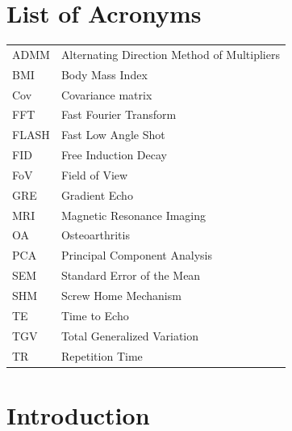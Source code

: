 \documentclass{micro-econ-thesis}
\begin{document}
\section*{List of Acronyms}
\begin{tabular}{@{}ll}
ADMM & Alternating Direction Method of Multipliers \\
BMI & Body Mass Index \\
Cov & Covariance matrix \\
FFT & Fast Fourier Transform \\ 
FLASH & Fast Low Angle Shot \\
FID & Free Induction Decay \\
FoV & Field of View \\
GRE & Gradient Echo \\
MRI & Magnetic Resonance Imaging \\
OA & Osteoarthritis\\
PCA & Principal Component Analysis \\
SEM & Standard Error of the Mean \\
SHM & Screw Home Mechanism \\
TE & Time to Echo \\
TGV & Total Generalized Variation \\
TR & Repetition Time 

\end{tabular}


\cleardoublepage
\pagestyle{headings}
\setcounter{page}{1}
\onehalfspacing %

\section{Introduction}
\end{document}
